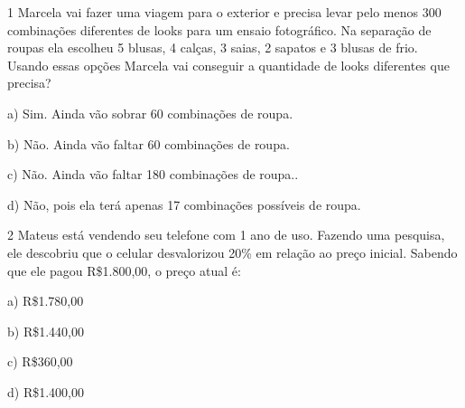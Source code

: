 
\num{1} Marcela vai fazer uma viagem para o exterior e precisa levar pelo
menos 300 combinações diferentes de looks para um ensaio fotográfico. Na
separação de roupas ela escolheu 5 blusas, 4 calças, 3 saias, 2 sapatos
e 3 blusas de frio. Usando essas opções Marcela vai conseguir a
quantidade de looks diferentes que precisa?

a) Sim. Ainda vão sobrar 60 combinações de roupa.

b) Não. Ainda vão faltar 60 combinações de roupa.

c) Não. Ainda vão faltar 180 combinações de roupa..

d) Não, pois ela terá apenas 17 combinações possíveis de roupa.



\num{2} Mateus está vendendo seu telefone com 1 ano de uso. Fazendo uma
pesquisa, ele descobriu que o celular desvalorizou 20\% em relação ao
preço inicial. Sabendo que ele pagou R\$1.800,00, o preço atual é:

a) R\$1.780,00

b) R\$1.440,00

c) R\$360,00

d) R\$1.400,00



